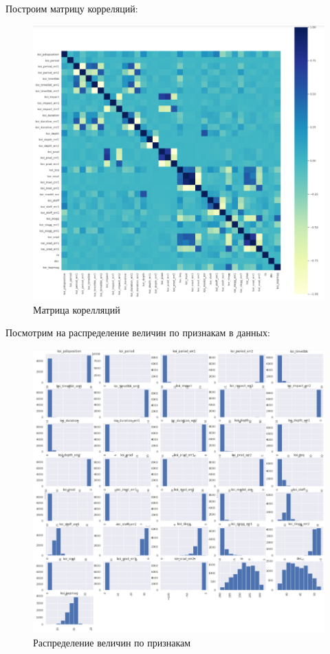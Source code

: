 \documentclass[a4paper,14pt]{article}
\begin{document}
Построим матрицу корреляций:

\begin{figure}[h!]
\centering
\includegraphics[scale=0.65]{pics/5.png}
\caption{Матрица корелляций}
\end{figure}

Посмотрим на распределение величин по признакам в данных:

\begin{figure}[h!]
\centering
\includegraphics[scale=0.6]{pics/6.png}
\caption{Распределение величин по признакам}
\end{figure}
\end{document}
